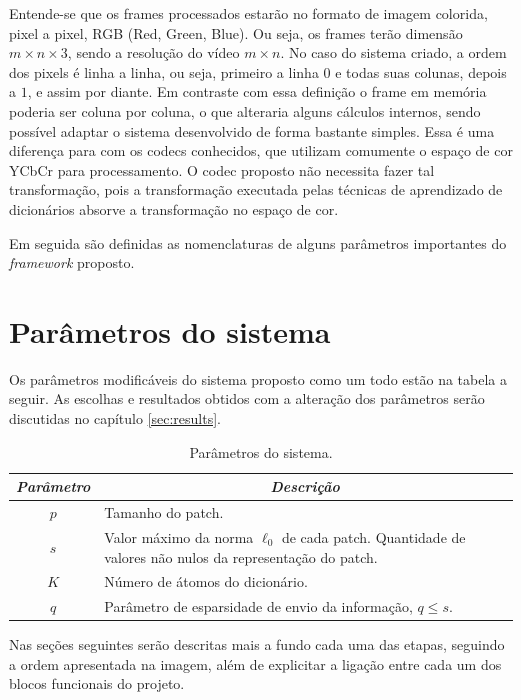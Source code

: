 \documentclass[cic,tc]{iiufrgs}
\begin{document}
Entende-se que os frames processados estarão no formato de imagem colorida,
pixel a pixel, RGB (Red, Green, Blue). 
Ou seja, os frames terão dimensão 
$m \times n \times 3$,
sendo a resolução do vídeo $m \times n$. 
No caso do sistema criado, a ordem dos pixels é 
linha a linha, ou seja, primeiro a linha $0$ e todas suas colunas, depois a $1$, e assim por diante.
Em contraste com essa definição o frame em memória poderia ser coluna por coluna, o que alteraria
alguns cálculos internos, sendo possível adaptar o sistema desenvolvido de forma bastante simples.
Essa é uma diferença para com os codecs conhecidos, que utilizam comumente o espaço de cor YCbCr
para processamento.
O codec proposto não necessita fazer tal transformação, pois a transformação executada pelas 
técnicas de aprendizado de dicionários absorve a transformação no espaço de cor.

Em seguida são definidas as nomenclaturas de alguns parâmetros importantes do
\textit{framework} proposto.

\section{Parâmetros do sistema}
Os parâmetros modificáveis do sistema proposto como um todo estão na tabela a seguir. 
As escolhas e resultados obtidos com a alteração dos parâmetros serão discutidas no 
capítulo \autoref{sec:results}.

\begin{table}[h]
    \caption{Parâmetros do sistema.}
    \centering
        \begin{tabular}{|c|p{10cm}|}
          \hline
          \multicolumn{1}{|c|}{\textit{Parâmetro}} & 
            \multicolumn{1}{c|}{\textit{Descrição}}\\
          \hline
          \hline
          $p$    & Tamanho do patch. \\ 
          $s$    & Valor máximo da norma $\ell_0$ de cada patch. Quantidade de valores não nulos da representação do patch. \\     
          $K$    & Número de átomos do dicionário. \\
          $q$    & Parâmetro de esparsidade de envio da informação, $q \le s$. \\
          \hline
        \end{tabular}
    \label{tbl:params}
\end{table}

Nas seções seguintes serão descritas mais a fundo cada uma das etapas, seguindo a ordem
apresentada na imagem, além de explicitar a ligação entre cada um dos blocos funcionais
do projeto.
\end{document}

